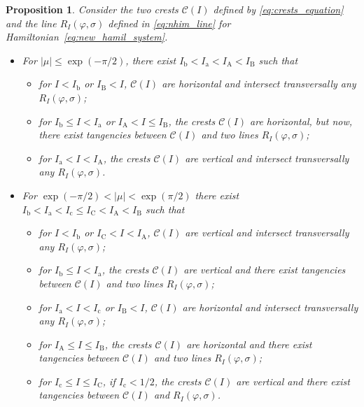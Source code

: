 \documentclass[a4paper,10pt]{article}
\newcommand{\NH}{\text{NHIM}}
\newtheorem{proposition}[theorem]{Proposition}
\theoremstyle{definition}
\begin{document}
\begin{proposition}\label{prop:cristas_behave}
Consider the two crests $\mathcal{C}(I)$ defined by \eqref{eq:crests_equation} and the {\NH} line $R_{I}(\varphi,\sigma)$ defined in \eqref{eq:nhim_line} for Hamiltonian~\eqref{eq:new_hamil_system}.
\begin{itemize}
\item For $\left|\mu\right| \leq \exp(-\pi/2)$, there exist $I_{\text{b}} < I_{\text{a}}< I_{\text{A}} <I_{\text{B}}$ such that
\begin{itemize}
\item for $I<I_{\text{b}}$ or  $I_{\text{B}}<I$, $\mathcal{C}(I)$ are horizontal and intersect transversally any $R_{I}(\varphi , \sigma)$;
\item for $I_{\text{b}} \leq I < I_{\text{a}}$ or $I_{\text{A}} < I\leq I_{\text{B}}$, the crests $\mathcal{C}(I)$ are horizontal, but now, there exist tangencies between $\mathcal{C}(I)$ and two {\NH} lines $R_{I}(\varphi , \sigma)$;
\item for $I_{\text{a}} < I < I_{\text{A}}$, the crests $\mathcal{C}(I)$ are vertical and intersect transversally any $R_{I}(\varphi , \sigma)$.
\end{itemize}
\item For $\exp(-\pi/2) < \left| \mu \right| < \exp( \pi/2)$ there exist $I_{\text{b}} < I_{\text{a}} < I _{\text{c}} \leq I_{\text{C}}< I_{\text{A}} <I_{\text{B}}$ such that
\begin{itemize}
\item for $I < I_{\text{b}}$ or $I_{\text{C}} < I < I_{\text{A}}$, $\mathcal{C}(I)$ are vertical and intersect transversally any $R_{I}(\varphi , \sigma)$;
\item for $I_{\text{b}}\leq I < I_{\text{a}}$, the crests $\mathcal{C}(I)$ are vertical and there exist tangencies between $\mathcal{C}(I)$ and two {\NH} lines $R_{I}(\varphi , \sigma)$;
\item for $I_{\text{a}} < I < I_{\text{c}}$ or $I_{\text{B}} < I$, $\mathcal{C}(I)$ are horizontal and  intersect transversally any $R_{I}(\varphi , \sigma)$;
\item for $I_{\text{A}} \leq I \leq I_{\text{B}}$, the crests $\mathcal{C}(I)$ are horizontal and there exist tangencies between $\mathcal{C}(I)$ and two {\NH} lines $R_{I}(\varphi , \sigma)$;
\item  for $I_{\text{c}} \leq I \leq I_{\text{C}}$,  if $I_{\text{c}} <1/2$, the crests $\mathcal{C}(I)$ are vertical and there
exist tangencies between $\mathcal{C}(I)$ and $R_{I}(\varphi,\sigma)$.

\end{itemize}
\end{itemize}
\end{proposition}
\end{document}
